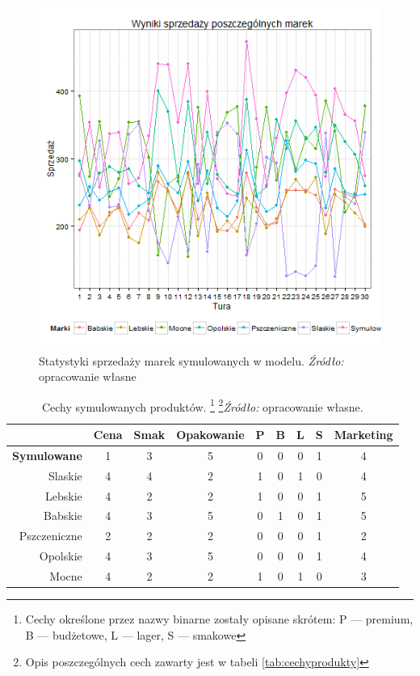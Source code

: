 \documentclass[polish, twoside, 12pt, a4paper]{article}
\theoremstyle{definition}
\theoremstyle{plain}
\theoremstyle{remark}
\begin{document}
\begin{figure}[hbt]
  \centering
    \includegraphics[width=\textwidth]{pictures/sprzedaz_marek.png}
  \captionsetup{margin=10pt,font=small,labelfont=bf,width=.8\textwidth}
  \caption[Statystyki sprzedaży marek symulowanych w modelu]{Statystyki sprzedaży marek symulowanych w modelu. \textit{Źródło:} opracowanie własne}\label{fig:sprzedaz_marek}
\end{figure}


\begin{table}[hbt] 
  \centering
  \captionsetup{margin=10pt,font=small,labelfont=bf,width=.8\textwidth}
  \caption[Cechy symulowanych produktów]{Cechy symulowanych produktów. \footnote{Cechy określone przez nazwy binarne zostały opisane skrótem: P --- premium, B --- budżetowe, L --- lager, S --- smakowe} \footnote{Opis poszczególnych cech zawarty jest w tabeli \ref{tab:cechyprodukty}}\textit{Źródło:} opracowanie własne.}
  \label{tab:produkty}
\vspace*{2ex}
  \begin{tabular}{rcccccccc}
  \hline
 & Cena & Smak & Opakowanie & P & B & L & S & Marketing \\ 
  \hline
\textbf{Symulowane} &   1 &   3 &   5 &   0 &   0 &   0 &   1 &   4 \\ 
  Slaskie &   4 &   4 &   2 &   1 &   0 &   1 &   0 &   4 \\ 
  Lebskie &   4 &   2 &   2 &   1 &   0 &   0 &   1 &   5 \\ 
  Babskie &   4 &   3 &   5 &   0 &   1 &   0 &   1 &   5 \\ 
  Pszczeniczne &   2 &   2 &   2 &   0 &   0 &   0 &   1 &   2 \\ 
  Opolskie &   4 &   3 &   5 &   0 &   0 &   0 &   1 &   4 \\ 
  Mocne &   4 &   2 &   2 &   1 &   0 &   1 &   0 &   3 \\ 
   \hline
\end{tabular}
\end{table} 
\end{document}
